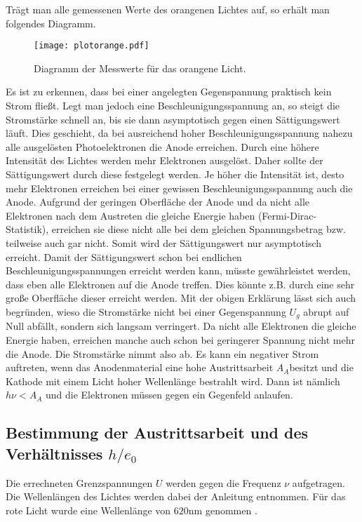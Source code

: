Trägt man alle gemessenen Werte des orangenen Lichtes auf, so erhält man folgendes Diagramm.

\begin{figure}[H]
  \centering
  \texttt{[image: plotorange.pdf]}
  \caption{Diagramm der Messwerte für das orangene Licht.}
  \label{fig:plotorange}
\end{figure}

Es ist zu erkennen, dass bei einer angelegten Gegenspannung praktisch kein Strom fließt. Legt man
jedoch eine Beschleunigungsspannung an, so steigt die Stromstärke schnell an, bis sie dann
asymptotisch gegen einen Sättigungswert läuft.
Dies geschieht, da bei ausreichend hoher Beschleunigungsspannung nahezu alle ausgelösten
Photoelektronen die Anode erreichen. Durch eine höhere Intensität des Lichtes werden mehr
Elektronen ausgelöst. Daher sollte der Sättigungswert durch diese festgelegt werden. Je höher
die Intensität ist, desto mehr Elektronen erreichen bei einer gewissen Beschleunigungsspannung
auch die Anode.
Aufgrund der geringen Oberfläche der Anode und da nicht alle Elektronen nach dem Austreten die gleiche Energie haben (Fermi-Dirac-Statistik), erreichen sie diese
nicht alle bei dem gleichen Spannungsbetrag bzw. teilweise auch gar nicht. Somit wird der Sättigungswert nur asymptotisch erreicht.
Damit der Sättigungswert schon bei endlichen Beschleunigungsspannungen erreicht werden kann, müsste gewährleistet werden, dass eben
alle Elektronen auf die Anode treffen. Dies könnte z.B. durch eine sehr große Oberfläche dieser erreicht werden.
Mit der obigen Erklärung lässt sich auch begründen, wieso die Stromstärke nicht bei einer Gegenspannung $U_g$ abrupt auf Null abfällt, sondern
sich langsam verringert. Da nicht alle Elektronen die gleiche Energie haben, erreichen manche auch schon bei geringerer Spannung nicht mehr
die Anode. Die Stromstärke nimmt also ab.
Es kann ein negativer Strom auftreten, wenn das Anodenmaterial eine hohe Austrittsarbeit $A_A$besitzt und die Kathode mit einem Licht hoher
Wellenlänge bestrahlt wird. Dann ist nämlich $h\nu<A_A$ und die Elektronen müssen gegen ein Gegenfeld anlaufen.


\subsection{Bestimmung der Austrittsarbeit und des Verhältnisses $h/e_0$}

Die errechneten Grenzspannungen $U$ werden gegen die Frequenz $\nu$ aufgetragen. Die Wellenlängen des Lichtes werden dabei der
Anleitung entnommen. Für das rote Licht wurde eine Wellenlänge von $620$nm genommen \cite{sample3}.


